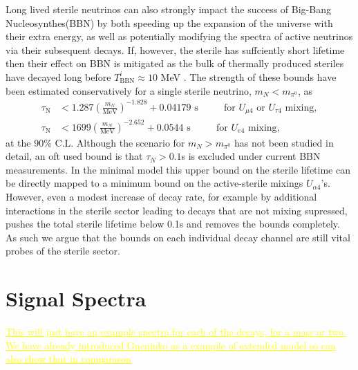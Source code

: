 \documentclass[11pt, a4paper]{article}
\newcommand{\newtext}[2]{\textcolor{#1}{\ul{#2}}}
\begin{document}
Long lived sterile neutrinos can also strongly impact the success of Big-Bang Nucleosynthes(BBN) by both speeding up the expansion of the universe with their extra energy, as well as potentially modifying the spectra of active neutrinos via their subsequent decays. If, however, the sterile has suffciently short lifetime  then their effect on BBN is mitigated as the bulk of thermally produced steriles have decayed long before $T^i_\text{BBN} \approx 10$ MeV \cite{Fields:2006ga}. The strength of these bounds have been estimated conservatively for a single sterile neutrino, $m_N < m_{\pi^0}$, as \cite{Dolgov:2000jw,Dolgov:2000pj}
\begin{align*}
	\tau_\text{N} &< 1.287 \left( \frac{m_N}{\text{MeV}}\right)^{-1.828}+0.04179 \text{  s    $\qquad$  for $U_{\mu 4}$ or $U_{\tau 4}$ mixing},\\
	\tau_\text{N} &< 1699 \left( \frac{m_N}{\text{MeV}}\right)^{-2.652}+0.0544 \text{  s    $\qquad$  for $U_{e 4}$ mixing},
\end{align*}
at the 90\% C.L. Although the scenario for $m_N > m_{\pi^0}$ has not been studied in detail, an oft used bound is that $\tau_N > 0.1$s is excluded under current BBN measurements. In the minimal model this upper bound on the sterile lifetime can be directly mapped to a minimum bound on the active-sterile mixings $U_{\alpha 4}$'s. However, even a modest increase of decay rate, for example by additional interactions in the sterile sector leading to decays that are not mixing supressed, pushes the total sterile lifetime below 0.1s and removes the bounds completely. As such we argue that the bounds on each individual decay channel are still vital probes of the sterile sector. \\

\section{Signal Spectra}

\newtext{MARK}{This will just have an example spectra for each of the decays, for a mass or two. We have already introduced Gneninko as a example of extended model so can also show that in comparason}
\end{document}

